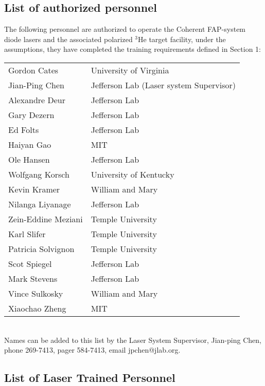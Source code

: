 \subsection{List of authorized personnel}
The following personnel are authorized to operate the Coherent FAP-system
diode lasers and the associated polarized $^3$He target facility, under 
the assumptions, they
have completed the training requirements defined in Section 1:
\\ 
\begin{tabular}{ll}
Gordon Cates            & University of Virginia \\
Jian-Ping Chen          & Jefferson Lab (Laser system Supervisor) \\
Alexandre Deur          & Jefferson Lab \\
Gary Dezern             & Jefferson Lab \\
Ed Folts                & Jefferson Lab \\
Haiyan Gao              & MIT \\
Ole Hansen              & Jefferson Lab \\
Wolfgang Korsch         & University of Kentucky \\
Kevin Kramer            & William and Mary \\
Nilanga Liyanage        & Jefferson Lab \\
Zein-Eddine Meziani     & Temple University \\
Karl Slifer             & Temple University \\
Patricia Solvignon	& Temple University \\
Scot Spiegel           & Jefferson Lab \\
Mark Stevens            & Jefferson Lab \\
Vince Sulkosky          & William and Mary \\
Xiaochao Zheng          & MIT \\
\end{tabular}


\\ 

Names can be added to this list by the Laser System Supervisor, 
Jian-ping Chen, phone 269-7413, pager 584-7413, email jpchen@jlab.org.




\subsection{List of Laser Trained Personnel}

